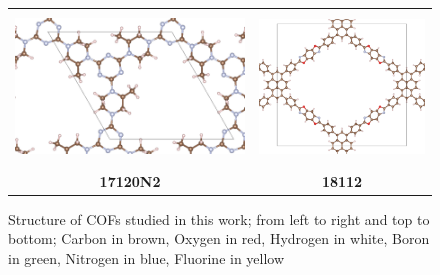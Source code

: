 \begin{figure}[H]
\begin{tabular}{cc}
\includegraphics[height=4cm]{images/17120.png} & \includegraphics[height=4cm]{images/18112.png} \\ 
\textbf{17120N2}\par\medskip & \textbf{18112}\par\medskip\\
\end{tabular}
\caption{Structure of COFs studied in this work; from left to right and top to bottom; Carbon in brown, Oxygen in red, Hydrogen in white, Boron in green, Nitrogen in blue, Fluorine in yellow}
\label{fig:struct}
\end{figure}
